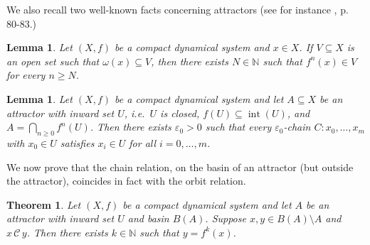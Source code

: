 \documentclass[10pt,a4paper]{article}
\theoremstyle{definition}
\theoremstyle{remark}
\theoremstyle{plain}
\newtheorem{lem}[defi]{Lemma}
\newtheorem{thm}[defi]{Theorem}
\begin{document}
We also recall two well-known facts concerning attractors (see for instance \cite{kurka03}, p. 80-83.)

\begin{lem}\label{lem:omega-neighbourhood}
    Let $(X,f)$ be a compact dynamical system and $x\in X$. 
    If $V\subseteq X$ is an open set such that $\omega(x)\subseteq V$, then 
    there exists $N\in\mathbb{N}$ such that $f^n(x)\in V$ for every $n\geq N$.
\end{lem}



\begin{lem}\label{lem:chain-trap}
    Let $(X,f)$ be a compact dynamical system and let $A\subseteq X$ be an 
    attractor with inward set $U$, i.e.\ $U$ is closed, 
    $f(U)\subseteq \operatorname{int}(U)$, and 
    $A=\bigcap_{n\geq 0} f^n(U)$. Then there exists $\varepsilon_0>0$ such that
    every $\varepsilon_0$-chain $C:x_0,\dots,x_m$ with $x_0\in U$ satisfies 
    $x_i\in U$ for all $i=0,\dots,m$.
\end{lem}

We now prove that the chain relation, on the basin of an attractor (but outside the attractor), coincides in fact with the orbit relation.

\begin{thm}\label{prop:gradient-like-orbit}
    Let $(X,f)$ be a compact dynamical system and let $A$ be an attractor with 
    inward set $U$ and basin $B(A)$. Suppose $x,y\in B(A)\setminus A$ and 
    $x\,\mathcal{C}\,y$. Then there exists $k\in\mathbb{N}$ such that 
    $y=f^k(x)$.
\end{thm}
\end{document}
